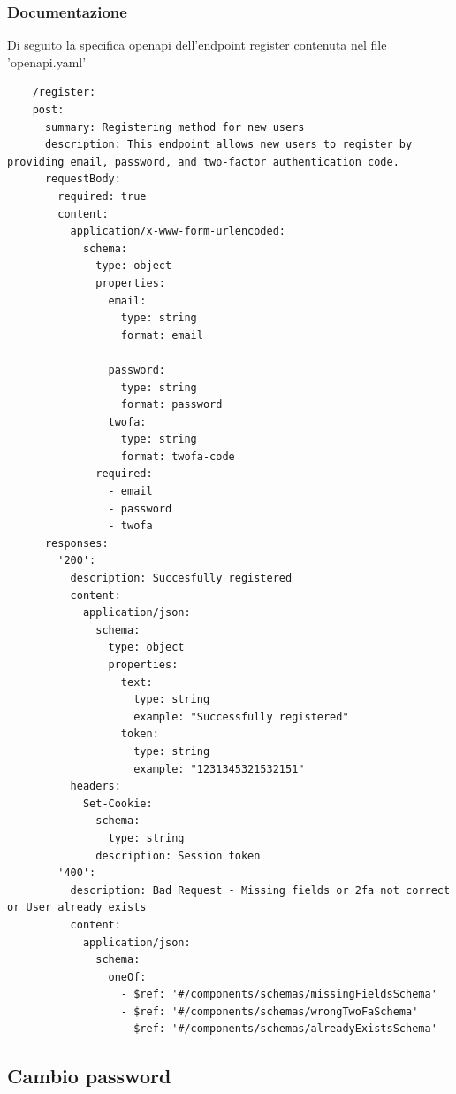 \documentclass{report}
\begin{document}
\subsubsection*{Documentazione}
Di seguito la specifica openapi dell'endpoint register contenuta nel file 'openapi.yaml'
\begin{verbatim}
	/register:
    post:
      summary: Registering method for new users
      description: This endpoint allows new users to register by providing email, password, and two-factor authentication code.
      requestBody:
        required: true
        content:
          application/x-www-form-urlencoded:
            schema:
              type: object
              properties:
                email:
                  type: string
                  format: email
                  
                password:
                  type: string
                  format: password
                twofa:
                  type: string
                  format: twofa-code
              required:
                - email
                - password
                - twofa
      responses:
        '200':
          description: Succesfully registered
          content:
            application/json:
              schema:
                type: object
                properties:
                  text:
                    type: string
                    example: "Successfully registered"
                  token:
                    type: string
                    example: "1231345321532151"
          headers:
            Set-Cookie:
              schema:
                type: string
              description: Session token
        '400':
          description: Bad Request - Missing fields or 2fa not correct or User already exists
          content:
            application/json:
              schema:
                oneOf:
                  - $ref: '#/components/schemas/missingFieldsSchema'
                  - $ref: '#/components/schemas/wrongTwoFaSchema'
                  - $ref: '#/components/schemas/alreadyExistsSchema'

\end{verbatim}
\subsection{Cambio password}
\end{document}
